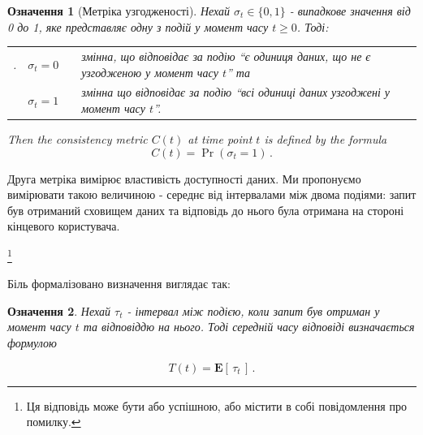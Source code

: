 \documentclass[14pt]{vakthesis}
\newtheorem{definition}{Означення}[chapter]
\begin{document}
\begin{definition}[Метріка узгодженості]
Нехай $\sigma_t\in\{0,1\}$ - випадкове значення від 0 до 1, яке  представляє одну з подій у момент часу $t\geq 0$.  Тоді:\\
\begin{tabular*}{\textwidth}{p{0.5cm}cp{0.5cm}p{}}.

&$\sigma_t=0$ && змінна, що відповідає за подію ``є одиниця даних, що не є узгодженою 
у момент часу $t$'' та\\
&$\sigma_t=1$ && змінна що відповідає за подію ``всі одиниці даних узгоджені у момент часу $t$''.
\end{tabular*}
Then the consistency metric $C(t)$ at time point $t$ is defined by the formula
\begin{equation}
	C(t)=\Pr(\sigma_t=1)\,.
\end{equation}
\end{definition}


Друга метріка вимірює властивість доступності даних.
Ми пропонуємо вимірювати такою величиною - середнє від інтервалами між двома подіями: запит був отриманий сховищем даних та
відповідь до нього була отримана на стороні кінцевого користувача.

\footnote{Ця відповідь може бути або успішною, або  містити в собі повідомлення про помилку.}

Біль формалізовано визначення виглядає так:

\begin{definition}
Нехай $\tau_t$ - інтервал між подією, коли запит був отриман у момент часу $t$ та відповіддю на нього.
Тоді середній часу відповіді визначається формулою

\begin{equation}
	T(t)=\mathbf{E}[\,\tau_t\,]\,.
\end{equation}
\end{definition}
\end{document}
